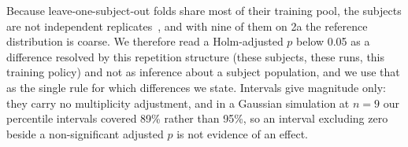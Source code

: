 Because leave-one-subject-out folds share most of their training pool, the subjects are not independent replicates~\cite{nadeau2003inference}, and with nine of them on 2a the reference distribution is coarse. We therefore read a Holm-adjusted $p$ below 0.05 as a difference resolved by this repetition structure (these subjects, these runs, this training policy) and not as inference about a subject population, and we use that as the single rule for which differences we state. Intervals give magnitude only: they carry no multiplicity adjustment, and in a Gaussian simulation at $n=9$ our percentile intervals covered 89\% rather than 95\%, so an interval excluding zero beside a non-significant adjusted $p$ is not evidence of an effect.
